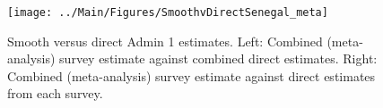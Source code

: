 \documentclass[12pt]{article}\usepackage[]{graphicx}\usepackage[]{color}
\newenvironment{knitrout}{}{} %
\begin{document}



\begin{knitrout}
\color{fgcolor}\begin{figure}[bht]

{\centering \texttt{[image: ../Main/Figures/SmoothvDirectSenegal\_meta]} 

}

\caption[Smooth versus direct Admin 1 estimates]{Smooth versus direct Admin 1 estimates. Left: Combined (meta-analysis) survey estimate against combined direct estimates. Right: Combined (meta-analysis) survey estimate against direct estimates from each survey.}\label{fig:unnamed-chunk-283}
\end{figure}


\end{knitrout}
\end{document}
